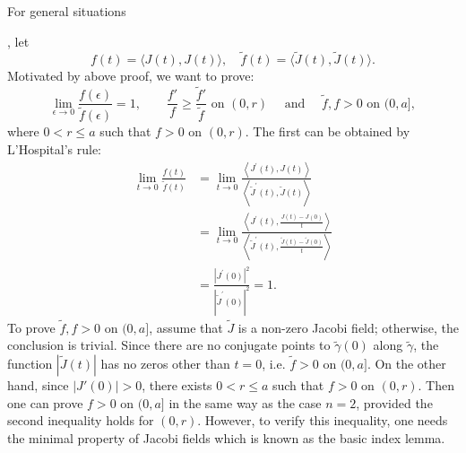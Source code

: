 \documentclass{ctexart}
\begin{document}
\hypertarget{GSpre}{For general situations}, let 
$$
f(t)=\langle J(t),J(t)\rangle,\quad \widetilde{f}(t)=\langle \widetilde{J}(t),\widetilde{J}(t)\rangle.
$$
Motivated by above proof, we want to prove: 
$$
\lim_{\epsilon \rightarrow 0} \frac{f(\epsilon)}{\tilde{f}(\epsilon)} = 1, \quad \quad \frac{f' }{f} \geq \frac{\tilde{f}'}{\tilde{f}} \text{ on } (0,r)\quad \text{ and } \quad 
\tilde{f},f > 0 \text{ on } (0,a],
$$
where $0<r\leq a$ such that $f>0$ on $(0,r)$.
The first can be obtained by L'Hospital's rule:
$$
\begin{aligned}
\lim _{t \rightarrow 0} \frac{f(t)}{\tilde{f}(t)} 
& =\lim _{t \rightarrow 0} \frac{\left\langle J^{\prime}(t), J(t)\right\rangle}{\left\langle\tilde{J}^{\prime}(t), \tilde{J}(t)\right\rangle} \\
& =\lim _{t \rightarrow 0} \frac{\left\langle J^{\prime}(t), \frac{J(t)-J(0)}{t}\right\rangle}{\left\langle\tilde{J}^{\prime}(t), \frac{\tilde{J}(t)-\tilde{J}(0)}{t}\right\rangle} \\
& =\frac{\left|J^{\prime}(0)\right|^2}{\left|\tilde{J}^{\prime}(0)\right|^2}=1.
\end{aligned}
$$
To prove $\tilde{f},f > 0$ on $(0,a]$, assume that $\tilde{J}$ is a non-zero Jacobi field; otherwise, the conclusion is trivial. 
Since there are no conjugate points to $\tilde{\gamma}(0)$ along $\tilde{\gamma}$, the function $|\tilde{J}(t)|$ has no zeros other than $t=0$, 
i.e. $\tilde{f} > 0$ on $(0,a]$. On the other hand, since $|J'(0)|>0$, there exists $0<r\leq a$ such that $f>0$ on $(0,r)$. 
Then one can prove $f>0$ on $(0,a]$ in the same way as the case $n=2$, provided the second inequality holds for $(0,r)$.  
However, to verify this inequality, one needs the minimal property of Jacobi fields which is known as the basic index lemma.

\end{document}
